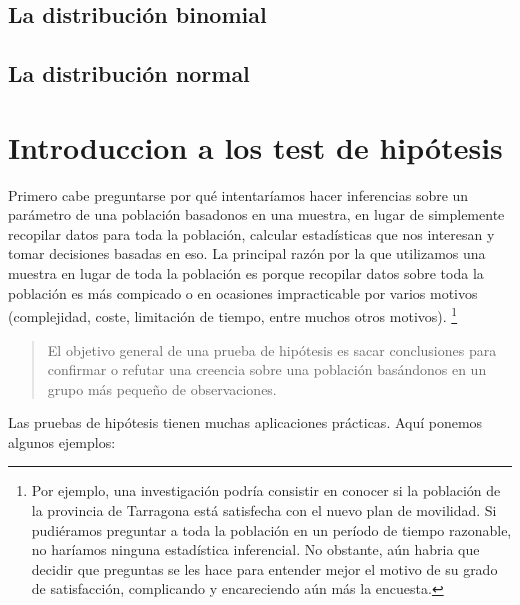 \documentclass[
]{book}
\begin{document}
\hypertarget{la-distribuciuxf3n-binomial}{%
\subsection{La distribución binomial}\label{la-distribuciuxf3n-binomial}}

\hypertarget{la-distribuciuxf3n-normal}{%
\subsection{La distribución normal}\label{la-distribuciuxf3n-normal}}

\hypertarget{introduccion-a-los-test-de-hipuxf3tesis}{%
\section{Introduccion a los test de hipótesis}\label{introduccion-a-los-test-de-hipuxf3tesis}}

Primero cabe preguntarse por qué intentaríamos hacer inferencias sobre un parámetro de una población basadonos en una muestra, en lugar de simplemente recopilar datos para toda la población, calcular estadísticas que nos interesan y tomar decisiones basadas en eso. La principal razón por la que utilizamos una muestra en lugar de toda la población es porque recopilar datos sobre toda la población es más compicado o en ocasiones impracticable por varios motivos (complejidad, coste, limitación de tiempo, entre muchos otros motivos). \footnote{Por ejemplo, una investigación podría consistir en conocer si la población de la provincia de Tarragona está satisfecha con el nuevo plan de movilidad. Si pudiéramos preguntar a toda la población en un período de tiempo razonable, no haríamos ninguna estadística inferencial. No obstante, aún habria que decidir que preguntas se les hace para entender mejor el motivo de su grado de satisfacción, complicando y encareciendo aún más la encuesta.}

\begin{quote}
El objetivo general de una prueba de hipótesis es sacar conclusiones para confirmar o refutar una creencia sobre una población basándonos en un grupo más pequeño de observaciones.
\end{quote}

Las pruebas de hipótesis tienen muchas aplicaciones prácticas. Aquí ponemos algunos ejemplos:
\end{document}
